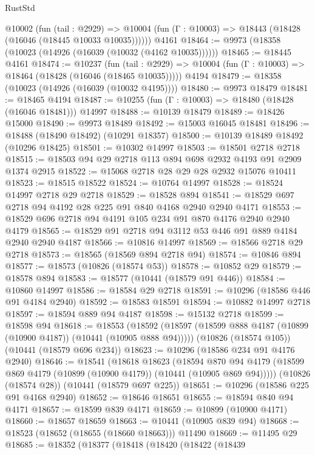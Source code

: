 \begin{lexlean}{RustStd}
\begin{coremodule}
    @10002
      (fun (tail : @2929) =>
      @10004 (fun (Γ : @10003) => @18443 (@18428 (@16046 (@18445 @10033 @10035))))))
    @4161
@18464 := @9973 (@18358 (@10023 (@14926 (@16039 (@10032 (@4162 @10035))))))
@18465 := @18445 @4161
@18474 := @10237
    (fun (tail : @2929) => @10004 (fun (Γ : @10003) => @18464 (@18428 (@16046 (@18465 @10035)))))
    @4194
@18479 := @18358 (@10023 (@14926 (@16039 (@10032 @4195))))
@18480 := @9973 @18479
@18481 := @18465 @4194
@18487 := @10255 (fun (Γ : @10003) => @18480 (@18428 (@16046 @18481))) @14997
@18488 := @10139 @18479
@18489 := @18426 @15000
@18490 := @9973 @18489
@18492 := @15003 @16045 @18481
@18496 := @18488 (@18490 @18492) (@10291 @18357)
@18500 := @10139 @18489 @18492 (@10296 @18425)
@18501 := @10302 @14997
@18503 := @18501 @2718 @2718
@18515 := @18503 @94 @29 @2718 @113 @894 @698 @2932 @4193 @91 @2909 @1374 @2915
@18522 := @15068 @2718 @28 @29 @28 @2932 @15076 @10411
@18523 := @18515 @18522
@18524 := @10764 @14997
@18528 := @18524 @14997 @2718 @29 @2718
@18529 := @18528 @894
@18541 := @18529 @697 @2718 @94 @4192 @28 @225 @91 @840 @4168 @2940 @2940 @4171
@18553 := @18529 @696 @2718 @94 @4191 @105 @234 @91 @870 @4176 @2940 @2940 @4179
@18565 := @18529 @91 @2718 @94 @3112 @53 @446 @91 @889 @4184 @2940 @2940 @4187
@18566 := @10816 @14997
@18569 := @18566 @2718 @29 @2718
@18573 := @18565 (@18569 @894 @2718 @94)
@18574 := @10846 @894
@18577 := @18573 (@10826 (@18574 @53))
@18578 := @10852 @29
@18579 := @18578 @894
@18583 := @18577 (@10441 (@18579 @91 @446))
@18584 := @10860 @14997
@18586 := @18584 @29 @2718
@18591 := @10296 (@18586 @446 @91 @4184 @2940)
@18592 := @18583 @18591
@18594 := @10882 @14997 @2718
@18597 := @18594 @889 @94 @4187
@18598 := @15132 @2718
@18599 := @18598 @94
@18618 := @18553
    (@18592 (@18597 (@18599 @888 @4187 (@10899 (@10900 @4187)) (@10441 (@10905 @888 @94)))))
    (@10826 (@18574 @105))
    (@10441 (@18579 @696 @234))
@18623 := @10296 (@18586 @234 @91 @4176 @2940)
@18646 := @18541
    (@18618
      @18623
      (@18594
        @870
        @94
        @4179
        (@18599 @869 @4179 (@10899 (@10900 @4179)) (@10441 (@10905 @869 @94)))))
    (@10826 (@18574 @28))
    (@10441 (@18579 @697 @225))
@18651 := @10296 (@18586 @225 @91 @4168 @2940)
@18652 := @18646 @18651
@18655 := @18594 @840 @94 @4171
@18657 := @18599 @839 @4171
@18659 := @10899 (@10900 @4171)
@18660 := @18657 @18659
@18663 := @10441 (@10905 @839 @94)
@18668 := @18523 (@18652 (@18655 (@18660 @18663))) @11490
@18669 := @11495 @29
@18685 := @18352
    (@18377
      (@18418
        (@18420
          (@18422
            (@18439

\end{coremodule}
\end{lexlean}
